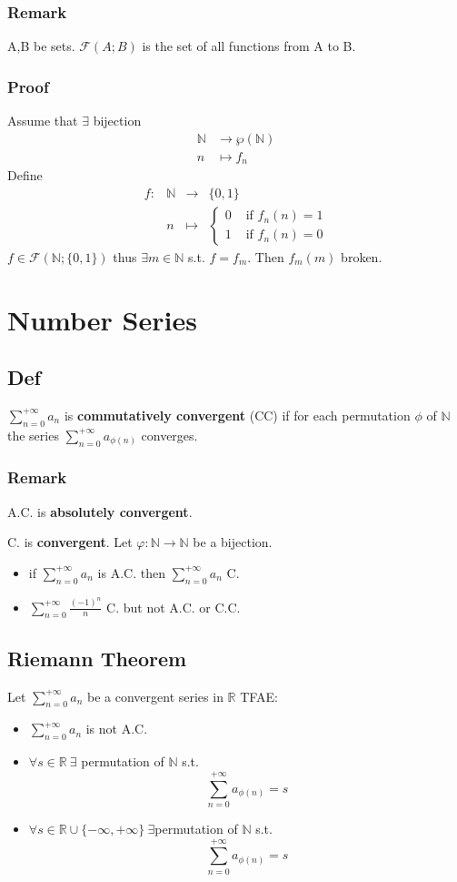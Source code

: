 \documentclass{book}
\begin{document}
\subsection*{Remark}
A,B be sets. $\mathcal{F}(A;B)$ is the set of all functions from A to B.
\subsection*{Proof}
Assume that $\exists$ bijection
$$\begin{aligned}
    \mathbb N &\rightarrow \wp(\mathbb N)\\ n&\mapsto f_n
\end{aligned}$$
Define $$\begin{aligned}
    f:&\mathbb N &\rightarrow &\{0,1\}\\ &n&\mapsto &\left\{\begin{aligned}
        0 &\text{ if }f_n(n)=1\\ 1&\text{ if }f_n(n)=0
    \end{aligned}\right.
\end{aligned}$$
$f\in \mathcal F(\mathbb N;\{0,1\})$ thus $\exists m\in \mathbb N$ s.t. $f=f_m$. Then $f_m(m)$ broken.
\chapter{Number Series}
\section{Def}
$\sum\limits_{n=0}^{+\infty}a_n$ is \textbf{commutatively convergent} (CC) if for each permutation $\phi$ of $\mathbb N$ the series $\sum\limits_{n=0}^{+\infty}a_{\phi(n)}$ converges. 
\subsection*{Remark}
A.C. is \textbf{absolutely convergent}.

C. is \textbf{convergent}.
Let $\varphi:\mathbb N\rightarrow \mathbb N$ be a bijection.
\begin{itemize}
    \item if $\sum\limits_{n=0}^{+\infty}a_n$ is A.C. then $\sum\limits_{n=0}^{+\infty}a_n$ C.
    \item $\sum\limits_{n=0}^{+\infty}\frac{(-1)^n}n$ C. but not A.C. or C.C.
\end{itemize}
\section{Riemann Theorem}
Let $\sum\limits_{n=0}^{+\infty}a_n$ be a convergent series in $\mathbb R$ TFAE:
\begin{itemize}
    \item $\sum\limits_{n=0}^{+\infty}a_n$ is not A.C.
    \item $\forall s\in \mathbb R\ \exists$ permutation of $\mathbb N$ s.t.$$\sum\limits_{n=0}^{+\infty}a_{\phi(n)}=s$$
    \item $\forall s\in \mathbb R\cup\{-\infty,+\infty\}\ \exists$permutation of $\mathbb N$ s.t.$$\sum\limits_{n=0}^{+\infty}a_{\phi(n)}=s$$ 
\end{itemize}
\end{document}
